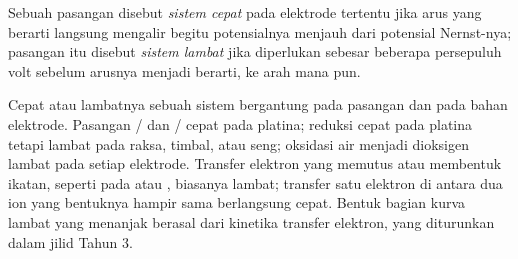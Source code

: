 \begin{definition}\label{def:b2:current-potential-curves:fast-slow}
Sebuah pasangan disebut \emph{sistem cepat} pada
elektrode tertentu jika arus yang berarti langsung mengalir begitu
potensialnya menjauh dari potensial Nernst-nya; pasangan itu disebut
\emph{sistem lambat} jika diperlukan 
sebesar beberapa persepuluh volt sebelum arusnya menjadi berarti, ke arah
mana pun.
\end{definition}

Cepat atau lambatnya sebuah sistem bergantung pada pasangan dan pada bahan
elektrode. Pasangan / dan / cepat pada
platina; reduksi  cepat pada platina tetapi lambat pada raksa,
timbal, atau seng; oksidasi air menjadi dioksigen lambat pada setiap
elektrode. Transfer elektron yang memutus atau membentuk ikatan, seperti
pada  atau , biasanya lambat; transfer satu elektron di
antara dua ion yang bentuknya hampir sama berlangsung cepat. Bentuk bagian
kurva lambat yang menanjak berasal dari kinetika transfer elektron, yang
diturunkan dalam jilid Tahun 3.

